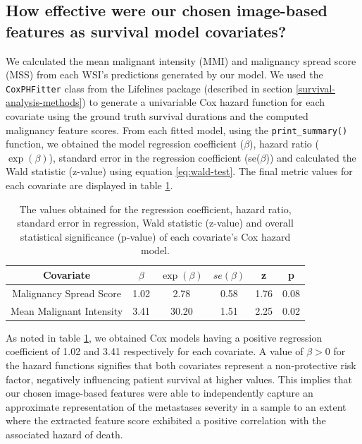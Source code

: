 \documentclass{l4proj}
\begin{document}
\subsection{How effective were our chosen image-based features as survival model covariates?}
We calculated the mean malignant intensity (MMI) and malignancy spread score (MSS) from each WSI's predictions generated by our model. We used the \texttt{CoxPHFitter} class from the Lifelines package (described in section \ref{survival-analysis-methods}) to generate a univariable Cox hazard function for each covariate using the ground truth survival durations and the computed malignancy feature scores. From each fitted model, using the \texttt{print\_summary()} function, we obtained the model regression coefficient (\(\beta\)), hazard ratio (\(\exp(\beta)\)), standard error in the regression coefficient (se(\(\beta\))) and calculated the Wald statistic (z-value) using equation \ref{eq:wald-test}. The final metric values for each covariate are displayed in table \ref{tab:model-stats}. 

\begin{table}[h]
    \centering
    \begin{tabular}{c|c|c|c|c|c}
    \hline 
         Covariate&\(\beta\)&\(\exp{(\beta)}\)&\(se(\beta)\)&z&p\\ \hline
         Malignancy Spread Score & 1.02 & 2.78 & 0.58 & 1.76 & 0.08 \\
         Mean Malignant Intensity & 3.41 & 30.20 & 1.51 & 2.25 & 0.02 
    \end{tabular}
    \caption{The values obtained for the regression coefficient, hazard ratio, standard error in regression, Wald statistic (z-value) and overall statistical significance (p-value) of each covariate's Cox hazard model.}
    \label{tab:model-stats}
\end{table}

As noted in table \ref{tab:model-stats}, we obtained Cox models having a positive regression coefficient of 1.02 and 3.41 respectively for each covariate. A value of \(\beta > 0\) for the hazard functions signifies that both covariates represent a non-protective risk factor, negatively influencing patient survival at higher values. This implies that our chosen image-based features were able to independently capture an approximate representation of the metastases severity in a sample to an extent where the extracted feature score exhibited a positive correlation with the associated hazard of death.
\end{document}
